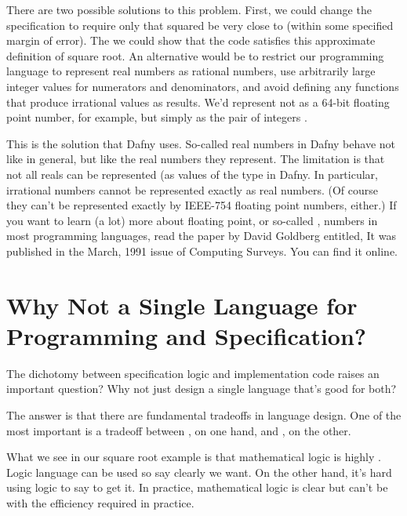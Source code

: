 \documentclass[letterpaper,10pt,english]{sphinxmanual}
\begin{document}
There are two possible solutions to this problem. First, we could
change the specification to require only that  squared be very
close to  (within some specified margin of error). The we could
show that the code satisfies this approximate definition of square
root. An alternative would be to restrict our programming language to
represent real numbers as rational numbers, use arbitrarily large
integer values for numerators and denominators, and avoid defining any
functions that produce irrational values as results. We’d represent
 not as a 64-bit floating point number, for example, but simply
as the pair of integers .

This is the solution that Dafny uses.  So-called real numbers in Dafny
behave not like  in general, but like the  real numbers they
represent. The limitation is that not all reals can be represented (as
values of the  type in Dafny. In particular, irrational numbers
cannot be represented exactly as real numbers. (Of course they can’t
be represented exactly by IEEE-754 floating point numbers, either.) If
you want to learn (a lot) more about floating point, or so-called
, numbers in most programming languages, read the paper by David
Goldberg entitled,  It was published in the March, 1991 issue
of Computing Surveys. You can find it online.


\section{Why Not a Single Language for Programming and Specification?}
\label{\detokenize{02-logic-and-code:why-not-a-single-language-for-programming-and-specification}}
The dichotomy between specification logic and implementation code
raises an important question? Why not just design a single language
that’s good for both?

The answer is that there are fundamental tradeoffs in language design.
One of the most important is a tradeoff between , on
one hand, and , on the other.

What we see in our square root example is that mathematical logic is
highly . Logic language can be used so say clearly 
we want. On the other hand, it’s hard using logic to say  to get
it. In practice, mathematical logic is clear but can’t be  with
the efficiency required in practice.
\end{document}
